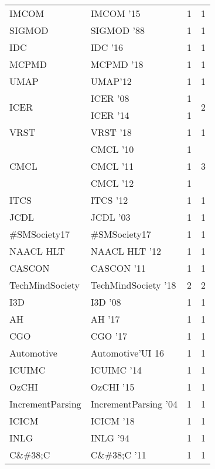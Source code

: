 \begin{table*}[t]
\begin{tabular}{llrr}
\multirow{1}{*}{IMCOM } & IMCOM '15 & 1 & \multirow{1}{*}{1}\\
\multirow{1}{*}{SIGMOD } & SIGMOD '88 & 1 & \multirow{1}{*}{1}\\
\multirow{1}{*}{IDC } & IDC '16 & 1 & \multirow{1}{*}{1}\\
\multirow{1}{*}{MCPMD } & MCPMD '18 & 1 & \multirow{1}{*}{1}\\
\multirow{1}{*}{UMAP} & UMAP'12 & 1 & \multirow{1}{*}{1}\\
\multirow{2}{*}{ICER } & ICER '08 & 1 & \multirow{2}{*}{2}\\
& ICER '14 & 1 &\\
\multirow{1}{*}{VRST } & VRST '18 & 1 & \multirow{1}{*}{1}\\
\multirow{3}{*}{CMCL } & CMCL '10 & 1 & \multirow{3}{*}{3}\\
& CMCL '11 & 1 &\\
& CMCL '12 & 1 &\\
\multirow{1}{*}{ITCS } & ITCS '12 & 1 & \multirow{1}{*}{1}\\
\multirow{1}{*}{JCDL } & JCDL '03 & 1 & \multirow{1}{*}{1}\\
\multirow{1}{*}{\#SMSociety17} & \#SMSociety17 & 1 & \multirow{1}{*}{1}\\
\multirow{1}{*}{NAACL HLT } & NAACL HLT '12 & 1 & \multirow{1}{*}{1}\\
\multirow{1}{*}{CASCON } & CASCON '11 & 1 & \multirow{1}{*}{1}\\
\multirow{1}{*}{TechMindSociety } & TechMindSociety '18 & 2 & \multirow{1}{*}{2}\\
\multirow{1}{*}{I3D } & I3D '08 & 1 & \multirow{1}{*}{1}\\
\multirow{1}{*}{AH } & AH '17 & 1 & \multirow{1}{*}{1}\\
\multirow{1}{*}{CGO } & CGO '17 & 1 & \multirow{1}{*}{1}\\
\multirow{1}{*}{Automotive} & Automotive'UI 16 & 1 & \multirow{1}{*}{1}\\
\multirow{1}{*}{ICUIMC } & ICUIMC '14 & 1 & \multirow{1}{*}{1}\\
\multirow{1}{*}{OzCHI } & OzCHI '15 & 1 & \multirow{1}{*}{1}\\
\multirow{1}{*}{IncrementParsing } & IncrementParsing '04 & 1 & \multirow{1}{*}{1}\\
\multirow{1}{*}{ICICM } & ICICM '18 & 1 & \multirow{1}{*}{1}\\
\multirow{1}{*}{INLG } & INLG '94 & 1 & \multirow{1}{*}{1}\\
\multirow{1}{*}{C\&\#38;C } & C\&\#38;C '11 & 1 & \multirow{1}{*}{1}\\

\end{tabular}
\end{table*}
